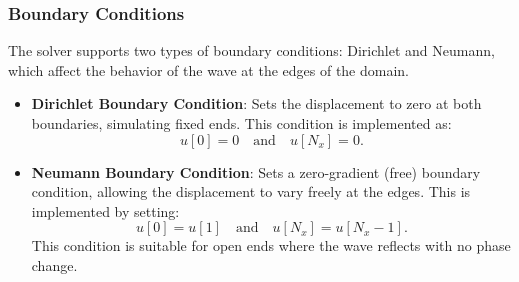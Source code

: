 \documentclass{article}
\begin{document}
		\begin{comment}
		
		\paragraph{Explanation of the Code} 
		
		1. **Averaging \( q \) Values**: 
		- \texttt{avg\_q\_right} and \texttt{avg\_q\_left} compute the averaged values of \( q \) to prevent abrupt changes in wave speed between neighboring points. These values control the effect of spatial derivatives in the update equation, improving stability.
		
		2. **Update Equation**: 
		- The displacement \( u[i] \) at the current time step is computed based on values from the previous two time steps, the averaged \( q \) values, and the source term \( f(x[i], t[n]) \). Each part of the update formula corresponds to a term in the finite difference approximation of the wave equation.
		
		3. **Loop Boundaries**: 
		- The loop runs from \texttt{i = 1} to \texttt{i = len(q) - 2}, excluding boundary points. Boundary conditions are applied separately to \( u[0] \) and \( u[N_x] \).
		
		\end{comment}
		
		\subsubsection{Boundary Conditions}
		
		The solver supports two types of boundary conditions: Dirichlet and Neumann, which affect the behavior of the wave at the edges of the domain.
		
		\begin{itemize}
			\item \textbf{Dirichlet Boundary Condition}: Sets the displacement to zero at both boundaries, simulating fixed ends. This condition is implemented as:
			\[
			u[0] = 0 \quad \text{and} \quad u[N_x] = 0.
			\]
			
			\item \textbf{Neumann Boundary Condition}: Sets a zero-gradient (free) boundary condition, allowing the displacement to vary freely at the edges. This is implemented by setting:
			\[
			u[0] = u[1] \quad \text{and} \quad u[N_x] = u[N_x - 1].
			\]
			This condition is suitable for open ends where the wave reflects with no phase change.
		\end{itemize}
		\newpage
\end{document}
